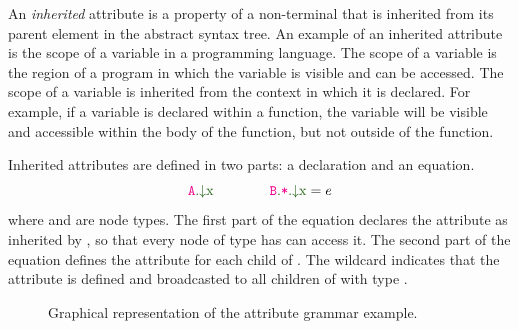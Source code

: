 An \emph{inherited} attribute is a property of a non-terminal that is inherited from
its parent element in the abstract syntax tree.
An example of an inherited attribute is the scope of a variable in a programming
language. The scope of a variable is the region of a program in which the variable
is visible and can be accessed. The scope of a variable is inherited from the
context in which it is declared. For example, if a variable is declared within a
function, the variable will be visible and accessible within the body of the function,
but not outside of the function.


Inherited attributes are defined in two parts: a declaration and an equation.
\begin{equation*}
\Ainh{A}{x} \quad\quad \quad\quad \Ainhdef{B}{*}{x} = e
\end{equation*}
where  and  are node types.
The first part of the equation declares the attribute  as inherited by ,
so that every node of type  has can access it. The second part of the
equation defines the attribute for each child of . The wildcard \astnode{*}
indicates that the attribute is defined and broadcasted to all children of  with type .

\begin{figure}
    \caption{\label{fig:ragsExample} Graphical representation of the attribute grammar example.}
\end{figure}

